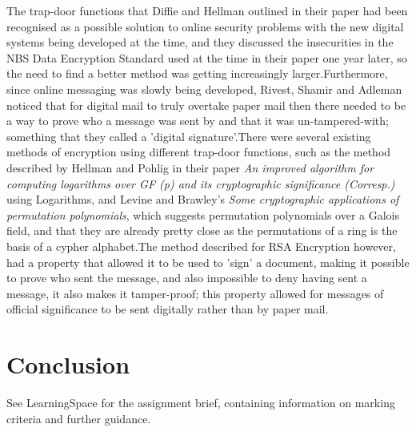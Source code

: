 \documentclass{article}
\begin{document}
The trap-door functions that Diffie and Hellman outlined in their paper\cite{diffie1976new} had been recognised as a possible solution to online security problems with the new digital systems being developed at the time, and they discussed the insecurities in the NBS Data Encryption Standard used at the time in their paper one year later\cite{diffie1977special}, so the need to find a better method was getting increasingly larger.\newline Furthermore, since online messaging was slowly being developed, Rivest, Shamir and Adleman noticed that for digital mail to truly overtake paper mail then there needed to be a way to prove who a message was sent by and that it was un-tampered-with; something that they called a 'digital signature'.\newline There were several existing methods of encryption using different trap-door functions, such as the method described by Hellman and Pohlig in their paper \textit{An improved algorithm for computing logarithms over GF (p) and its cryptographic significance (Corresp.)}\cite{pohlig1978improved} using Logarithms, and Levine and Brawley's \textit{Some cryptographic applications of permutation polynomials}\cite{levine1977some}, which suggests permutation polynomials over a Galois field, and that they are already pretty close as the permutations of a ring is the basis of a cypher alphabet.\newline The method described for RSA Encryption however, had a property that allowed it to be used to 'sign' a document, making it possible to prove who sent the message, and also impossible to deny having sent a message, it also makes it tamper-proof; this property allowed for messages of official significance to be sent digitally rather than by paper mail.

\section{Conclusion}

See LearningSpace for the assignment brief, containing information on marking criteria and further guidance.



\end{document}
